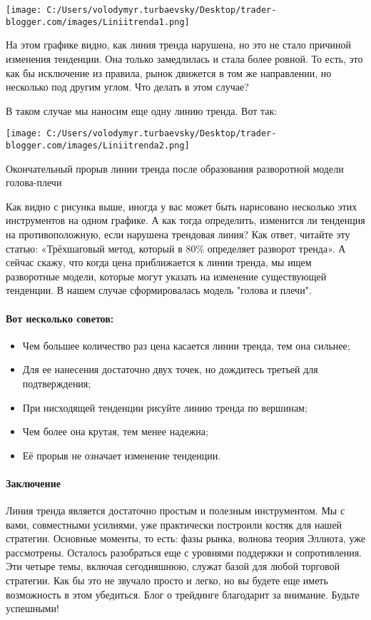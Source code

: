 \documentclass[a5paper]{article}
\begin{document}
\texttt{[image: C:/Users/volodymyr.turbaevsky/Desktop/trader-blogger.com/images/Liniitrenda1.png]}

На этом графике видно, как линия тренда нарушена, но это не стало причиной изменения тенденции. Она только замедлилась и стала более ровной. То есть, это как бы исключение из правила, рынок движется в том же направлении, но несколько под другим углом. Что делать в этом случае?

В таком случае мы наносим еще одну линию тренда. Вот так:

\texttt{[image: C:/Users/volodymyr.turbaevsky/Desktop/trader-blogger.com/images/Liniitrenda2.png]}

Окончательный прорыв линии тренда после образования разворотной модели голова-плечи

Как видно с рисунка выше, иногда у вас может быть нарисовано несколько этих инструментов на одном графике. А как тогда определить, изменится ли тенденция на противоположную, если нарушена трендовая линия? Как ответ, читайте эту статью: «Трёхшаговый метод, который в 80\% определяет разворот тренда».  А сейчас скажу, что когда цена приближается к линии тренда, мы ищем разворотные модели, которые могут указать на изменение существующей тенденции. В нашем случае сформировалась модель "голова и плечи".

\paragraph{Вот несколько советов:}
\begin{itemize}
\item Чем большее количество раз цена касается линии тренда, тем она сильнее;
\item Для ее нанесения достаточно двух точек, но дождитесь третьей для подтверждения;
\item При нисходящей тенденции рисуйте линию тренда по вершинам;
\item Чем более она крутая, тем менее надежна;
\item Её прорыв не означает изменение тенденции.
\end{itemize}

\paragraph{Заключение}

Линия тренда является достаточно простым и полезным инструментом. Мы с вами, совместными усилиями, уже практически построили костяк для нашей стратегии. Основные моменты, то есть: фазы рынка, волнова теория Эллиота, уже рассмотрены. Осталось разобраться еще с уровнями поддержки и сопротивления. Эти четыре темы, включая сегодняшнюю, служат базой для любой торговой стратегии. Как бы это не звучало просто и легко, но вы будете еще иметь возможность в этом убедиться. Блог о трейдинге благодарит за внимание. Будьте успешными!
\end{document}
